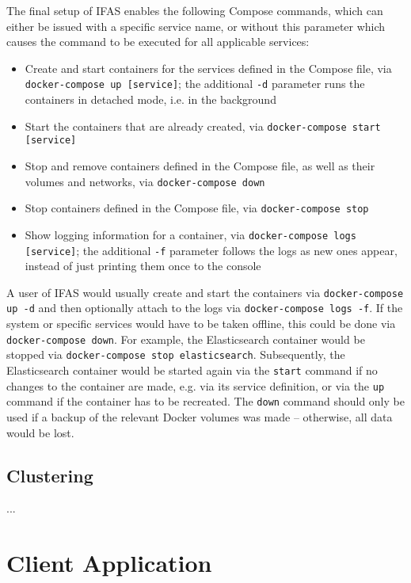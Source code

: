 The final setup of \ac{IFAS} enables the following Compose commands, which can either be issued with a specific service name, or without this parameter which causes the command to be executed for all applicable services:

\begin{itemize}
\item Create and start containers for the services defined in the Compose file, via \texttt{docker-compose up [service]}; the additional \texttt{-d} parameter runs the containers in detached mode, i.e. in the background
\item Start the containers that are already created, via \texttt{docker-compose start [service]}
\item Stop and remove containers defined in the Compose file, as well as their volumes and networks, via \texttt{docker-compose down}
\item Stop containers defined in the Compose file, via \texttt{docker-compose stop}
\item Show logging information for a container, via \texttt{docker-compose logs [service]}; the additional \texttt{-f} parameter follows the logs as new ones appear, instead of just printing them once to the  console
\end{itemize}

A user of \ac{IFAS} would usually create and start the containers via \texttt{docker-compose up -d} and then optionally attach to the logs via \texttt{docker-compose logs -f}.
If the system or specific services would have to be taken offline, this could be done via \texttt{docker-compose down}.
For example, the Elasticsearch container would be stopped via \texttt{docker-compose stop elasticsearch}.
Subsequently, the Elasticsearch container would be started again via the \texttt{start} command if no changes to the container are made, e.g. via its service definition, or via the \texttt{up} command if the container has to be recreated.
The \texttt{down} command should only be used if a backup of the relevant Docker volumes was made -- otherwise, all data would be lost.

\subsection{Clustering}

...

\section{Client Application}
\label{sec:implementation:client}


